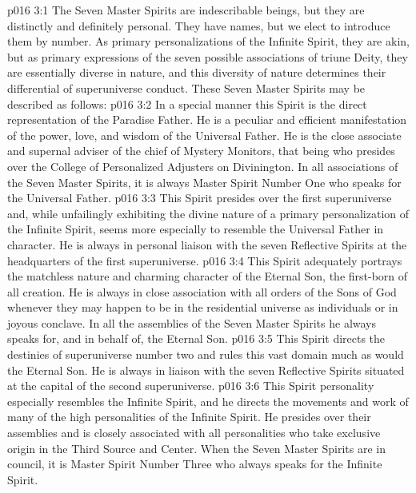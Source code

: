 \vs p016 3:1 The Seven Master Spirits are indescribable beings, but they are distinctly and definitely personal. They have names, but we elect to introduce them by number. As primary personalizations of the Infinite Spirit, they are akin, but as primary expressions of the seven possible associations of triune Deity, they are essentially diverse in nature, and this diversity of nature determines their differential of superuniverse conduct. These Seven Master Spirits may be described as follows:
\vs p016 3:2  In a special manner this Spirit is the direct representation of the Paradise Father. He is a peculiar and efficient manifestation of the power, love, and wisdom of the Universal Father. He is the close associate and supernal adviser of the chief of Mystery Monitors, that being who presides over the College of Personalized Adjusters on Divinington. In all associations of the Seven Master Spirits, it is always Master Spirit Number One who speaks for the Universal Father.
\vs p016 3:3 This Spirit presides over the first superuniverse and, while unfailingly exhibiting the divine nature of a primary personalization of the Infinite Spirit, seems more especially to resemble the Universal Father in character. He is always in personal liaison with the seven Reflective Spirits at the headquarters of the first superuniverse.
\pc \vs p016 3:4  This Spirit adequately portrays the matchless nature and charming character of the Eternal Son, the first\hyp{}born of all creation. He is always in close association with all orders of the Sons of God whenever they may happen to be in the residential universe as individuals or in joyous conclave. In all the assemblies of the Seven Master Spirits he always speaks for, and in behalf of, the Eternal Son.
\vs p016 3:5 This Spirit directs the destinies of superuniverse number two and rules this vast domain much as would the Eternal Son. He is always in liaison with the seven Reflective Spirits situated at the capital of the second superuniverse.
\pc \vs p016 3:6  This Spirit personality especially resembles the Infinite Spirit, and he directs the movements and work of many of the high personalities of the Infinite Spirit. He presides over their assemblies and is closely associated with all personalities who take exclusive origin in the Third Source and Center. When the Seven Master Spirits are in council, it is Master Spirit Number Three who always speaks for the Infinite Spirit.
